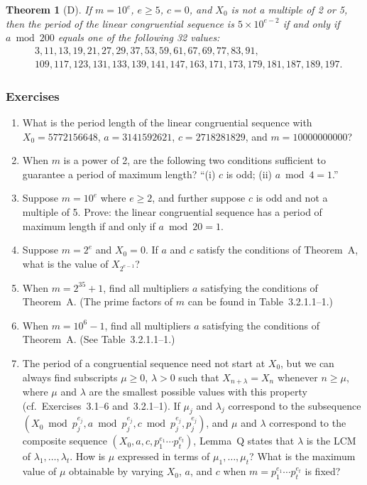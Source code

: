 \documentclass[12pt]{article}
\newtheorem{theorem}{Theorem}[section]
\begin{document}
\begin{theorem}[D]
If $m = 10^e$, $e \geq 5$, $c = 0$, and $X_0$ is not a multiple of 2 or 5, then the period of the linear congruential sequence is $5 \times 10^{e-2}$ if and only if $a \bmod 200$ equals one of the following 32 values:
\begin{align*}
&3, 11, 13, 19, 21, 27, 29, 37, 53, 59, 61, 67, 69, 77, 83, 91, \\
&109, 117, 123, 131, 133, 139, 141, 147, 163, 171, 173, 179, 181, 187, 189, 197.
\end{align*}
\end{theorem}

\subsubsection*{Exercises}
\begin{enumerate}
\item[\textbf{1.}] [10] What is the period length of the linear congruential sequence with $X_0 = 5772156648$, $a = 3141592621$, $c = 2718281829$, and $m = 10000000000$?

\item[\textbf{2.}] [10] When $m$ is a power of 2, are the following two conditions sufficient to guarantee a period of maximum length? ``(i) $c$ is odd; (ii) $a \bmod 4 = 1$.''

\item[\textbf{3.}] [13] Suppose $m = 10^e$ where $e \geq 2$, and further suppose $c$ is odd and not a multiple of 5. Prove: the linear congruential sequence has a period of maximum length if and only if $a \bmod 20 = 1$.

\item[\textbf{4.}] [$M20$] Suppose $m = 2^e$ and $X_0 = 0$. If $a$ and $c$ satisfy the conditions of Theorem~A, what is the value of $X_{2^{e-1}}$?

\item[\textbf{5.}] [14] When $m = 2^{35} + 1$, find all multipliers $a$ satisfying the conditions of Theorem~A. (The prime factors of $m$ can be found in Table~3.2.1.1--1.)

\item[\textbf{6.}] [20] When $m = 10^6 - 1$, find all multipliers $a$ satisfying the conditions of Theorem~A. (See Table~3.2.1.1--1.)

\item[\textbf{7.}] [$M23$] The period of a congruential sequence need not start at $X_0$, but we can always find subscripts $\mu \geq 0$, $\lambda > 0$ such that $X_{n+\lambda} = X_n$ whenever $n \geq \mu$, where $\mu$ and $\lambda$ are the smallest possible values with this property (cf.\ Exercises~3.1--6 and~3.2.1--1). If $\mu_j$ and $\lambda_j$ correspond to the subsequence $(X_0 \bmod p_j^{e_j}, a \bmod p_j^{e_j}, c \bmod p_j^{e_j}, p_j^{e_j})$, and $\mu$ and $\lambda$ correspond to the composite sequence $(X_0, a, c, p_1^{e_1} \cdots p_t^{e_t})$, Lemma~Q states that $\lambda$ is the LCM of $\lambda_1, \ldots, \lambda_t$. How is $\mu$ expressed in terms of $\mu_1, \ldots, \mu_t$? What is the maximum value of $\mu$ obtainable by varying $X_0$, $a$, and $c$ when $m = p_1^{e_1} \cdots p_t^{e_t}$ is fixed?


\end{enumerate}
\end{document}
